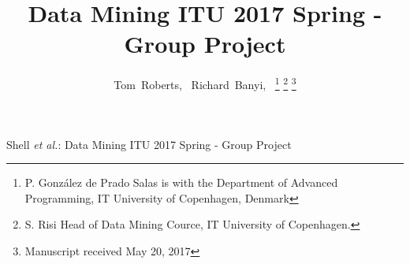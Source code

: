 \documentclass[journal]{IEEEtran}
\begin{document}
%
\title{Data Mining ITU 2017 Spring - Group Project}
%
%
%

\author{Tom~Roberts,~
        Richard~Banyi,~%
\thanks{P.  González de Prado Salas is with the Department
of Advanced Programming, IT University of Copenhagen, Denmark}%
\thanks{S. Risi Head of Data Mining Cource, IT University of Copenhagen.}%
\thanks{Manuscript received May 20, 2017}}

% 
%



%
{Shell \MakeLowercase{\textit{et al.}}: Data Mining ITU 2017 Spring - Group Project}
% 
\end{document}
